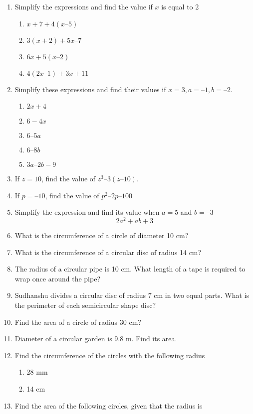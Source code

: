 \begin{enumerate}[label=\thesection.\arabic*, ref=\thesection.\theenumi]
\begin{enumerate}
\end{enumerate}
\item  Simplify the expressions and find the value if $x$ is equal to 2 
	\begin{enumerate}
\item $ x + 7 + 4 (x – 5)$
\item $ 3 (x + 2) + 5x – 7 $
\item $ 6x + 5 (x – 2) $
\item $ 4(2x – 1) + 3x + 11$
\end{enumerate}
\item  Simplify these expressions and find their values if $x = 3, a = – 1, b = – 2$. 
	\begin{enumerate}
\item $ 2x +4 $
\item $6 - 4x$
\item $6 – 5a $
\item $6 – 8b $
\item $3a – 2b-9 $
\end{enumerate}
\item If $z = 10$, find the value of $z^3 – 3(z – 10)$. 
\item  If $p = – 10$, find the value of $p^2 – 2p – 100$
\item  Simplify the expression and find its value when $a = 5$ and $b = – 3$
	$$ 2a^2 + ab + 3 $$
\item What is the circumference of a circle of diameter 10 cm?
\item What is the circumference of a circular disc of radius 14 cm?
\item The radius of a circular pipe is 10 cm. What length of a tape is required to wrap once around the pipe?
\item Sudhanshu divides a circular disc of radius 7 cm in two equal parts. What is the perimeter of each semicircular shape disc?
\item Find the area of a circle of radius 30 cm?
\item Diameter of a circular garden is 9.8 m. Find its area.
\item Find the circumference of the circles with the following radius  
	\begin{enumerate}
		\item 28 mm
\item  14 cm
\end{enumerate}
\item  Find the area of the following circles, given that the radius is
	\begin{enumerate}

\end{enumerate}
\end{enumerate}
